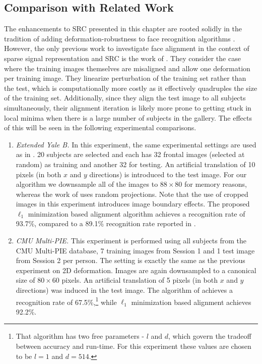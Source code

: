 \subsection{Comparison with Related Work}
The enhancements to SRC presented in this chapter are rooted 
solidly in the tradition of
adding deformation-robustness to face recognition algorithms
\cite{Cootes2001-PAMI,Gross2006-PAMI,Wiskott1997-PAMI}.
However, the only previous work to investigate face alignment
in the context of sparse signal representation and SRC is the
work of \cite{Huang2008-CVPR}. They consider the case where the
training images themselves are misaligned and allow one
deformation per training image. They linearize perturbation of the training
set rather than the test, which is computationally more costly as
it effectively quadruples the size of the training set. 
Additionally, since they align the test image to all subjects
simultaneously, their alignment iteration is likely more prone 
to getting stuck in local minima when there is a large number
of subjects in the gallery.  The effects of this will be seen
in the following experimental comparisons.
\begin{enumerate}
\item {\em Extended Yale B.} In this experiment, the
    same experimental settings are used as in
    \cite{Huang2008-CVPR}. 20 subjects are selected and
    each has 32 frontal images (selected at random) as
    training and another 32 for testing. An artificial
    translation of 10 pixels (in both $x$ and $y$
    directions) is introduced to the test image. For our
    algorithm we downsample all of the images to $88\times
    80$ for memory reasons, whereas the work of
    \cite{Huang2008-CVPR} uses random projections.
	Note that the use of cropped images in this 
	experiment introduces image boundary effects.
    The proposed $\ell_1$ minimization based alignment
    algorithm achieves a recognition rate of 93.7\%,
    compared to a 89.1\% recognition rate reported in
    \cite{Huang2008-CVPR}.
\item {\em CMU Multi-PIE.} This experiment is performed
	using
    all subjects from the CMU Multi-PIE database, 7
    training images from Session 1 and 1 test image from
    Session 2 per person. The setting is exactly the same
    as the previous experiment on 2D deformation. Images are again
    downsampled to a canonical size of $80\times 60$ pixels. An
    artificial translation of 5 pixels (in both $x$ and $y$
    directions) was induced in the test image. The
    algorithm of \cite{Huang2008-CVPR} achieves a
    recognition rate of 67.5\%,\footnote{That algorithm has
    two free parameters - $l$ and $d$, which govern the tradeoff between
	accuracy and run-time. For this experiment
    these values are chosen to be $l = 1$ and $d = 514$.} while 
	$\ell_1$ minimization based alignment achieves 92.2\%.
    \end{enumerate}
				
